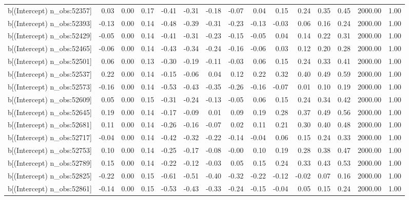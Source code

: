 \begin{table}[ht]
\begin{tabular}{rrrrrrrrrrrrrrr}
  b[(Intercept) n\_obs:52357] & 0.03 & 0.00 & 0.17 & -0.41 & -0.31 & -0.18 & -0.07 & 0.04 & 0.15 & 0.24 & 0.35 & 0.45 & 2000.00 & 1.00 \\ 
  b[(Intercept) n\_obs:52393] & -0.13 & 0.00 & 0.14 & -0.48 & -0.39 & -0.31 & -0.23 & -0.13 & -0.03 & 0.06 & 0.16 & 0.24 & 2000.00 & 1.00 \\ 
  b[(Intercept) n\_obs:52429] & -0.05 & 0.00 & 0.14 & -0.41 & -0.31 & -0.23 & -0.15 & -0.05 & 0.04 & 0.14 & 0.22 & 0.31 & 2000.00 & 1.00 \\ 
  b[(Intercept) n\_obs:52465] & -0.06 & 0.00 & 0.14 & -0.43 & -0.34 & -0.24 & -0.16 & -0.06 & 0.03 & 0.12 & 0.20 & 0.28 & 2000.00 & 1.00 \\ 
  b[(Intercept) n\_obs:52501] & 0.06 & 0.00 & 0.13 & -0.30 & -0.19 & -0.11 & -0.03 & 0.06 & 0.15 & 0.24 & 0.33 & 0.41 & 2000.00 & 1.00 \\ 
  b[(Intercept) n\_obs:52537] & 0.22 & 0.00 & 0.14 & -0.15 & -0.06 & 0.04 & 0.12 & 0.22 & 0.32 & 0.40 & 0.49 & 0.59 & 2000.00 & 1.00 \\ 
  b[(Intercept) n\_obs:52573] & -0.16 & 0.00 & 0.14 & -0.53 & -0.43 & -0.35 & -0.26 & -0.16 & -0.07 & 0.01 & 0.10 & 0.19 & 2000.00 & 1.00 \\ 
  b[(Intercept) n\_obs:52609] & 0.05 & 0.00 & 0.15 & -0.31 & -0.24 & -0.13 & -0.05 & 0.06 & 0.15 & 0.24 & 0.34 & 0.42 & 2000.00 & 1.00 \\ 
  b[(Intercept) n\_obs:52645] & 0.19 & 0.00 & 0.14 & -0.17 & -0.09 & 0.01 & 0.09 & 0.19 & 0.28 & 0.37 & 0.49 & 0.56 & 2000.00 & 1.00 \\ 
  b[(Intercept) n\_obs:52681] & 0.11 & 0.00 & 0.14 & -0.26 & -0.16 & -0.07 & 0.02 & 0.11 & 0.21 & 0.30 & 0.40 & 0.48 & 2000.00 & 1.00 \\ 
  b[(Intercept) n\_obs:52717] & -0.04 & 0.00 & 0.14 & -0.42 & -0.32 & -0.22 & -0.14 & -0.04 & 0.06 & 0.15 & 0.24 & 0.33 & 2000.00 & 1.00 \\ 
  b[(Intercept) n\_obs:52753] & 0.10 & 0.00 & 0.14 & -0.25 & -0.17 & -0.08 & -0.00 & 0.10 & 0.19 & 0.28 & 0.38 & 0.47 & 2000.00 & 1.00 \\ 
  b[(Intercept) n\_obs:52789] & 0.15 & 0.00 & 0.14 & -0.22 & -0.12 & -0.03 & 0.05 & 0.15 & 0.24 & 0.33 & 0.43 & 0.53 & 2000.00 & 1.00 \\ 
  b[(Intercept) n\_obs:52825] & -0.22 & 0.00 & 0.15 & -0.61 & -0.51 & -0.40 & -0.32 & -0.22 & -0.12 & -0.02 & 0.07 & 0.16 & 2000.00 & 1.00 \\ 
  b[(Intercept) n\_obs:52861] & -0.14 & 0.00 & 0.15 & -0.53 & -0.43 & -0.33 & -0.24 & -0.15 & -0.04 & 0.05 & 0.15 & 0.24 & 2000.00 & 1.00 \\ 

\end{tabular}
\end{table}
